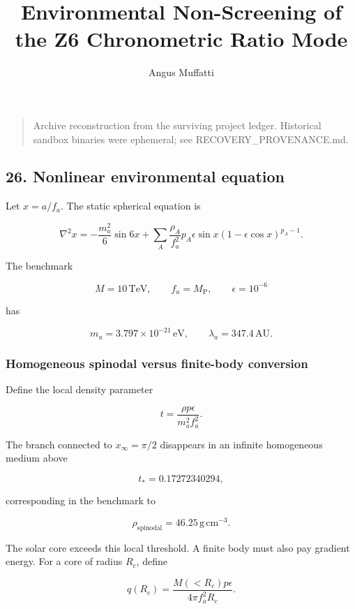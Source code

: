 \documentclass[
]{article}
\title{Environmental Non-Screening of the Z6 Chronometric Ratio Mode}
\author{Angus Muffatti}
\date{}
\begin{document}
\maketitle

\begin{quote}
Archive reconstruction from the surviving project ledger. Historical
sandbox binaries were ephemeral; see RECOVERY\_PROVENANCE.md.
\end{quote}

\hypertarget{nonlinear-environmental-equation}{%
\subsection{26. Nonlinear environmental
equation}\label{nonlinear-environmental-equation}}

Let \(x=a/f_a\). The static spherical equation is

\[
\nabla^2x
=-\frac{m_a^2}{6}\sin6x
+\sum_A\frac{\rho_A}{f_a^2}
 p_A\epsilon\sin x
 (1-\epsilon\cos x)^{p_A-1}.
\]

The benchmark

\[
M=10\,\mathrm{TeV},
\qquad
f_a=M_{\mathrm{P}},
\qquad
\epsilon=10^{-6}
\]

has

\[
m_a=3.797\times10^{-21}\,\mathrm{eV},
\qquad
\lambda_a=347.4\,\mathrm{AU}.
\]

\hypertarget{homogeneous-spinodal-versus-finite-body-conversion}{%
\subsubsection{Homogeneous spinodal versus finite-body
conversion}\label{homogeneous-spinodal-versus-finite-body-conversion}}

Define the local density parameter

\[
t=\frac{\rho p\epsilon}{m_a^2f_a^2}.
\]

The branch connected to \(x_\infty=\pi/2\) disappears in an infinite
homogeneous medium above

\[
t_*=0.17272340294,
\]

corresponding in the benchmark to

\[
\rho_{\mathrm{spinodal}}=46.25\,\mathrm{g\,cm^{-3}}.
\]

The solar core exceeds this local threshold. A finite body must also pay
gradient energy. For a core of radius \(R_c\), define

\[
q(R_c)=\frac{M(<R_c)p\epsilon}{4\pi f_a^2R_c}.
\]
\end{document}
